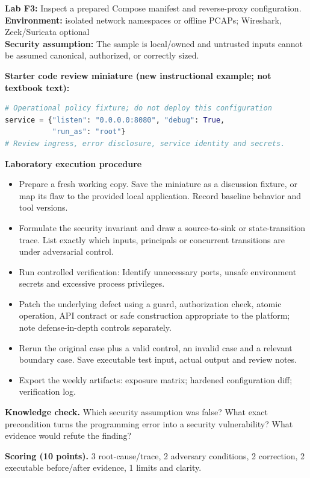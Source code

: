 \documentclass[10pt,letterpaper]{article}
\begin{document}
\begin{insight}\textbf{Lab F3:} Inspect a prepared Compose manifest and reverse-proxy configuration.\\\textbf{Environment:} isolated network namespaces or offline PCAPs; Wireshark, Zeek/Suricata optional\\\textbf{Security assumption:} The sample is local/owned and untrusted inputs cannot be assumed canonical, authorized, or correctly sized.\end{insight}
\textbf{Starter code review miniature (new instructional example; not textbook text):}
\begin{lstlisting}[language=Python]
# Operational policy fixture; do not deploy this configuration
service = {"listen": "0.0.0.0:8080", "debug": True,
           "run_as": "root"}
# Review ingress, error disclosure, service identity and secrets.
\end{lstlisting}
\textbf{Laboratory execution procedure}
\begin{itemize}[leftmargin=*,itemsep=2pt]
\item Prepare a fresh working copy. Save the miniature as a discussion fixture, or map its flaw to the provided local application. Record baseline behavior and tool versions.
\item Formulate the security invariant and draw a source-to-sink or state-transition trace. List exactly which inputs, principals or concurrent transitions are under adversarial control.
\item Run controlled verification: Identify unnecessary ports, unsafe environment secrets and excessive process privileges.
\item Patch the underlying defect using a guard, authorization check, atomic operation, API contract or safe construction appropriate to the platform; note defense-in-depth controls separately.
\item Rerun the original case plus a valid control, an invalid case and a relevant boundary case. Save executable test input, actual output and review notes.
\item Export the weekly artifacts: exposure matrix; hardened configuration diff; verification log.
\end{itemize}
\textbf{Knowledge check.} Which security assumption was false? What exact precondition turns the programming error into a security vulnerability? What evidence would refute the finding?

\textbf{Scoring (10 points).} 3 root-cause/trace, 2 adversary conditions, 2 correction, 2 executable before/after evidence, 1 limits and clarity.
\end{document}
